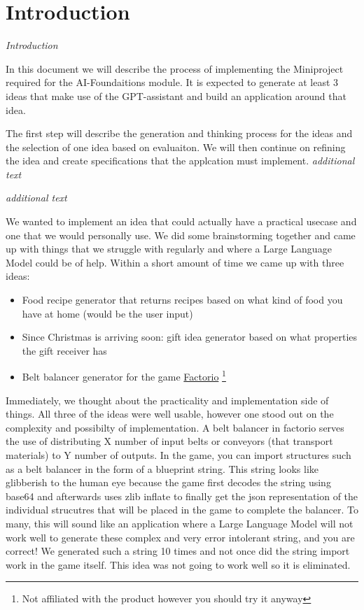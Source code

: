 \chapter{Introduction}
\label{chapter:introduction}

\emph{Introduction}

In this document we will describe the process of implementing the Miniproject required for the AI-Foundaitions module.
It is expected to generate at least 3 ideas that make use of the GPT-assistant and build an application around that idea.

The first step will describe the generation and thinking process for the ideas and the selection of one idea based on evaluaiton.
We will then continue on refining the idea and create specifications that the applcation must implement.
\emph{additional text}

\medskip

\emph{additional text}

We wanted to implement an idea that could actually have a practical usecase and one that we would personally use.
We did some brainstorming together and came up with things that we struggle with regularly and where a Large Language Model could be of help.
Within a short amount of time we came up with three ideas:
\begin{itemize}
    \item Food recipe generator that returns recipes based on what kind of food you have at home (would be the user input)
    \item Since Christmas is arriving soon: gift idea generator based on what properties the gift receiver has
    \item Belt balancer generator for the game \href{https://www.factorio.com}{Factorio} \footnote{Not affiliated with the product however you should try it anyway}
\end{itemize}

Immediately, we thought about the practicality and implementation side of things. All three of the ideas were well usable, however one stood out on the complexity and possibilty of implementation.
A belt balancer in factorio serves the use of distributing X number of input belts or conveyors (that transport materials) to Y number of outputs.
In the game, you can import structures such as a belt balancer in the form of a blueprint string.
This string looks like glibberish to the human eye because the game first decodes the string using base64 and afterwards uses zlib inflate to finally get the json representation of the individual strucutres that will be placed in the game to complete the balancer.
To many, this will sound like an application where a Large Language Model will not work well to generate these complex and very error intolerant string, and you are correct!
We generated such a string 10 times and not once did the string import work in the game itself.
This idea was not going to work well so it is eliminated.


